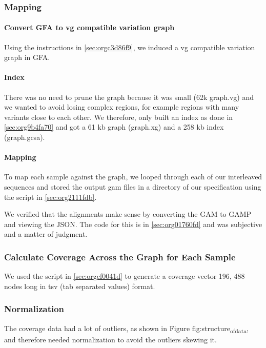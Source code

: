 \documentclass[10pt, a4paper]{article}
\begin{document}
\subsubsection{Mapping}
\label{sec:orgb3e5ebd}
\paragraph{Convert GFA to vg compatible variation graph}
\label{sec:orgd0b8b17}
Using the instructions in \ref{sec:orgc3d86f9}, we induced a vg 
\cite{garrisonVariationGraphToolkit2018} compatible variation graph in GFA.

\paragraph{Index}
\label{sec:org62660a4}
There was no need to prune the graph because it was small (62k graph.vg) and we 
wanted to avoid losing complex regions, for example regions with many variants
close to each other.
We therefore, only built an index as done in \ref{sec:org9b4fa70} and got a 61 kb 
graph (graph.xg) and a 258 kb index (graph.gcsa).

\paragraph{Mapping}
\label{sec:orgf7a7829}
To map each sample against the graph, we looped through each of our interleaved 
sequences and stored the output gam files in a directory of our specification
using the script in \ref{sec:org2111fdb}.

We verified that the alignments make sense by converting the GAM to GAMP and
viewing the JSON. The code for this is in \ref{sec:org01760fd} and was subjective and a 
matter of judgment.

\subsubsection{Calculate Coverage Across the Graph for Each Sample}
\label{sec:orgd43b96a}
We used the script in \ref{sec:orgcf0041d} to generate a coverage vector 196, 488 nodes
long in tsv (tab separated values) format.

\subsubsection{Normalization}
\label{sec:orgf9929e5}
The coverage data had a lot of outliers, as shown in Figure fig:structure\textsubscript{of}\textsubscript{data}, and
therefore needed normalization to avoid the outliers skewing it.
\end{document}
